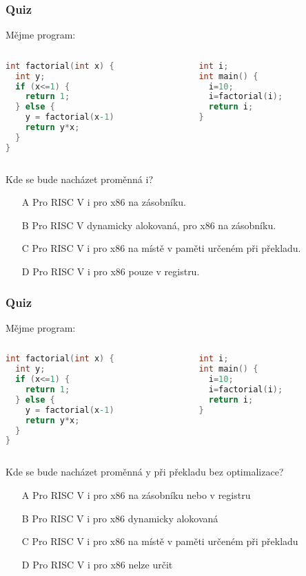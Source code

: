 \documentclass{beamer}
\begin{document}
\begin{frame}[fragile]
\frametitle{Quiz}

Mějme program:
\begin{columns}
\begin{column}{0.45\textwidth}
\begin{lstlisting}[language={C},columns=flexible]
int factorial(int x) {
  int y;
  if (x<=1) {
    return 1;
  } else {
    y = factorial(x-1)
    return y*x;
  }
}
\end{lstlisting}
\end{column}
\hfill
\begin{column}{0.45\textwidth}  
\begin{lstlisting}[language={C},columns=flexible]
int i;
int main() {
  i=10;
  i=factorial(i);
  return i;
}
\end{lstlisting}
\end{column}
\end{columns}

Kde se bude nacházet proměnná i?
\begin{itemize}
\item[A] Pro RISC V i pro x86 na zásobníku.
\item[B] Pro RISC V dynamicky alokovaná, pro x86 na zásobníku.
\item[C] Pro RISC V i pro x86 na místě v paměti určeném při překladu.
\item[D] Pro RISC V i pro x86 pouze v registru.
\end{itemize}
\end{frame}


\begin{frame}[fragile]
\frametitle{Quiz}

Mějme program:
\begin{columns}
\begin{column}{0.45\textwidth}
\begin{lstlisting}[language={C},columns=flexible]
int factorial(int x) {
  int y;
  if (x<=1) {
    return 1;
  } else {
    y = factorial(x-1)
    return y*x;
  }
}
\end{lstlisting}
\end{column}
\hfill
\begin{column}{0.45\textwidth}  
\begin{lstlisting}[language={C},columns=flexible]
int i;
int main() {
  i=10;
  i=factorial(i);
  return i;
}
\end{lstlisting}
\end{column}
\end{columns}

Kde se bude nacházet proměnná y při překladu bez optimalizace?
\begin{itemize}
\item[A] Pro RISC V i pro x86 na zásobníku nebo v registru
\item[B] Pro RISC V i pro x86 dynamicky alokovaná
\item[C] Pro RISC V i pro x86 na místě v paměti určeném při překladu
\item[D] Pro RISC V i pro x86 nelze určit
\end{itemize}
\end{frame}
\end{document}
